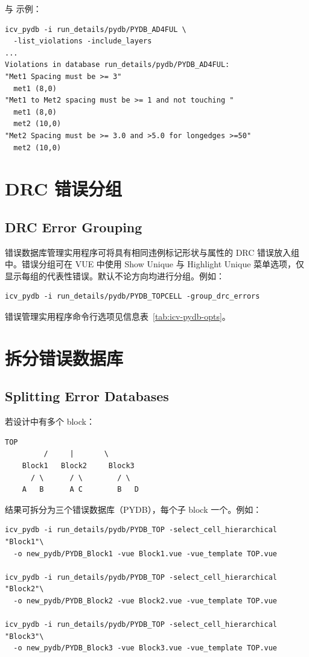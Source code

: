  与  示例：
\begin{lstlisting}[style=shell]
icv_pydb -i run_details/pydb/PYDB_AD4FUL \
  -list_violations -include_layers
...
Violations in database run_details/pydb/PYDB_AD4FUL:
"Met1 Spacing must be >= 3"
  met1 (8,0)
"Met1 to Met2 spacing must be >= 1 and not touching "
  met1 (8,0)
  met2 (10,0)
"Met2 Spacing must be >= 3.0 and >5.0 for longedges >=50"
  met2 (10,0)
\end{lstlisting}

\section{DRC 错误分组}
\subsection*{DRC Error Grouping}

错误数据库管理实用程序可将具有相同违例标记形状与属性的 DRC 错误放入组中。错误分组可在 VUE 中使用 Show Unique 与 Highlight Unique 菜单选项，仅显示每组的代表性错误。默认不论方向均进行分组。例如：
\begin{lstlisting}[style=shell]
icv_pydb -i run_details/pydb/PYDB_TOPCELL -group_drc_errors
\end{lstlisting}

错误管理实用程序命令行选项见信息表~\ref{tab:icv-pydb-opts}。

\section{拆分错误数据库}
\subsection*{Splitting Error Databases}

若设计中有多个 block：
\begin{lstlisting}[style=shell]
              TOP
         /     |       \
    Block1   Block2     Block3
      / \      / \        / \
    A   B      A C        B   D
\end{lstlisting}

结果可拆分为三个错误数据库（PYDB），每个子 block 一个。例如：
\begin{lstlisting}[style=shell]
icv_pydb -i run_details/pydb/PYDB_TOP -select_cell_hierarchical "Block1"\
  -o new_pydb/PYDB_Block1 -vue Block1.vue -vue_template TOP.vue

icv_pydb -i run_details/pydb/PYDB_TOP -select_cell_hierarchical "Block2"\
  -o new_pydb/PYDB_Block2 -vue Block2.vue -vue_template TOP.vue

icv_pydb -i run_details/pydb/PYDB_TOP -select_cell_hierarchical "Block3"\
  -o new_pydb/PYDB_Block3 -vue Block3.vue -vue_template TOP.vue
\end{lstlisting}

